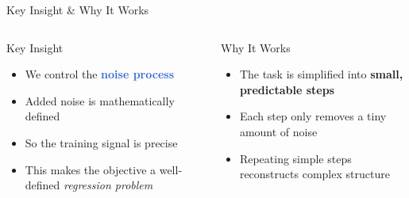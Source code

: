 \documentclass[handout, aspectratio=169,11pt]{beamer}
\newcommand{\emphasisword}[2]{\textcolor{#1}{\textbf{#2}}}
\newcommand{\highlight}[1]{\emphasisword{Highlight}{#1}}
\begin{document}
\begin{frame}{Key Insight \& Why It Works}
  \begin{columns}[T]
      \begin{block}{Key Insight}
        \begin{itemize}
          \item We control the \highlight{noise process}
          \item Added noise is mathematically defined
          \item So the training signal is precise
          \item This makes the objective a well-defined \textit{regression problem}
        \end{itemize}
      \end{block}
      
    \pause

      \begin{block}{Why It Works}
        \begin{itemize}
          \item The task is simplified into \textbf{small, predictable steps}
          \item Each step only removes a tiny amount of noise
          \item Repeating simple steps reconstructs complex structure
        \end{itemize}
      \end{block}
  \end{columns}
\end{frame}

\end{document}
